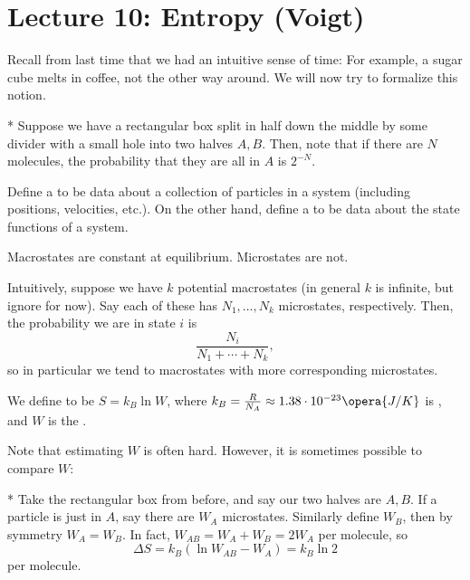 \section*{Lecture 10: Entropy (Voigt)}
\setcounter{section}{10}

Recall from last time that we had an intuitive sense of time: For example, a sugar cube melts in coffee, not the other way around.
We will now try to formalize this notion. 

\begin{exm}*
	Suppose we have a rectangular box split in half down the middle by some divider with a small hole into two halves $A, B$. 
	Then, note that if there are $N$ molecules, the probability that they are all in $A$ is $2^{-N}$.
\end{exm}

\begin{defn}
	Define a  to be data about a collection of particles in a system (including positions, velocities, etc.).
	On the other hand, define a  to be data about the state functions of a system.
\end{defn}

\begin{fact}
	Macrostates are constant at equilibrium. Microstates are not.
\end{fact}

Intuitively, suppose we have $k$ potential macrostates (in general $k$ is infinite, but ignore for now). 
Say each of these has $N_1, \ldots, N_k$ microstates, respectively. Then, the probability we are in state $i$ is \[
	\frac{N_i}{N_1 + \cdots + N_k},
\]
so in particular we tend to macrostates with more corresponding microstates.

\begin{defn}
	We define  to be $S = k_B \ln W$, where $k_B = \frac R{N_A} \approx 1.38\cdot 10^{-23} \opera{J/K}$ is , and $W$ is the .
\end{defn}

Note that estimating $W$ is often hard.
However, it is sometimes possible to compare $W$:

\begin{exm}*
	Take the rectangular box from before, and say our two halves are $A,B$. If a particle is just in $A$, say there are $W_A$ microstates.
	Similarly define $W_B$, then by symmetry $W_A = W_B$. In fact, $W_{AB} = W_A + W_B = 2W_A$ per molecule, so \[
		\Delta S = k_B(\ln W_{AB} - W_A) = k_B\ln 2 
	\]
	per molecule.
\end{exm}

